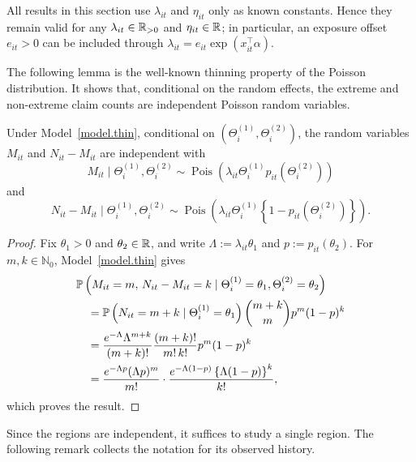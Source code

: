 \begin{remark}\label{rem.thin.exposure}
All results in this section use \(\lambda_{it}\) and \(\eta_{it}\) only
as known constants. Hence they remain valid for any
\(\lambda_{it}\in\Real_{>0}\) and \(\eta_{it}\in\Real\); in particular,
an exposure offset \(e_{it}>0\) can be included through
\(\lambda_{it}=e_{it}\exp\left(x_{it}^\top\alpha\right)\).
\end{remark}

The following lemma is the well-known thinning property of the Poisson
distribution. It shows that, conditional on the random effects, the
extreme and non-extreme claim counts are independent Poisson random
variables.

\begin{lemma}
\label{lem.thin}
Under Model~\ref{model.thin}, conditional on
\(\left(\Theta_i^{(1)},\Theta_i^{(2)}\right)\), the random variables
\(M_{it}\) and \(N_{it}-M_{it}\) are independent with
\[
M_{it}\mid\Theta_i^{(1)},\Theta_i^{(2)}
\sim
\operatorname{Pois}\left(
\lambda_{it}\Theta_i^{(1)}p_{it}\left(\Theta_i^{(2)}\right)
\right)
\]
and
\[
N_{it}-M_{it}\mid\Theta_i^{(1)},\Theta_i^{(2)}
\sim
\operatorname{Pois}\left(
\lambda_{it}\Theta_i^{(1)}
\left\{1-p_{it}\left(\Theta_i^{(2)}\right)\right\}
\right).
\]
\end{lemma}

\begin{proof}
Fix \(\theta_1>0\) and \(\theta_2\in\Real\), and write
\(\Lambda:=\lambda_{it}\theta_1\) and \(p:=p_{it}(\theta_2)\). For
\(m,k\in\mathbb N_0\), Model~\ref{model.thin} gives
\[
\begin{aligned}
&\P{M_{it}=m,\,N_{it}-M_{it}=k\mid
\Theta_i^{(1)}=\theta_1,\Theta_i^{(2)}=\theta_2}\\
&\quad=
\P{N_{it}=m+k\mid\Theta_i^{(1)}=\theta_1}
\binom{m+k}{m}p^m(1-p)^k\\
&\quad=
\frac{e^{-\Lambda}\Lambda^{m+k}}{(m+k)!}
\frac{(m+k)!}{m!\,k!}p^m(1-p)^k\\
&\quad=
\frac{e^{-\Lambda p}(\Lambda p)^m}{m!}
\cdot
\frac{e^{-\Lambda(1-p)}\left\{\Lambda(1-p)\right\}^k}{k!},
\end{aligned}
\]
which proves the result.
\end{proof}

Since the regions are independent, it suffices to study a single
region. The following remark collects the notation for its observed
history.

